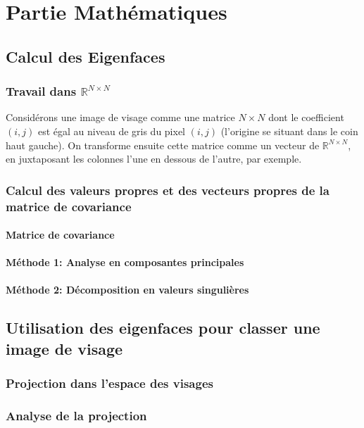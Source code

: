 \documentclass[12pt]{article}
\begin{document}
\maketitle
\newpage
\section{Partie Mathématiques}
\subsection{Calcul des Eigenfaces}
\subsubsection{Travail dans $\mathbb{R}^{N \times N}$}
Considérons une image de visage comme une matrice $N \times N$ dont le coefficient $(i,j)$ est égal au niveau de gris du pixel $(i,j)$ (l'origine se situant dans le coin haut gauche).  
On transforme ensuite cette matrice comme un vecteur de $\mathbb{R}^{N \times N}$, en juxtaposant les colonnes l'une en dessous de l'autre, par exemple.
\subsubsection{Calcul des valeurs propres et des vecteurs propres de la matrice de covariance}

\paragraph{Matrice de covariance}
\paragraph{Méthode 1: Analyse en composantes principales}
\paragraph{Méthode 2: Décomposition en valeurs singulières}
\subsection{Utilisation des eigenfaces pour classer une image de visage}
\subsubsection{Projection dans l'espace des visages}
\subsubsection{Analyse de la projection}
\end{document}
